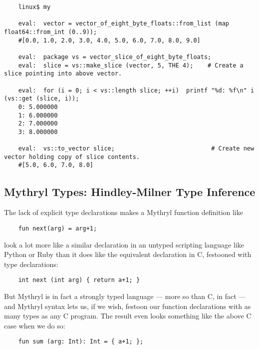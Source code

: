 \begin{verbatim}
    linux$ my

    eval:  vector = vector_of_eight_byte_floats::from_list (map float64::from_int (0..9));
    #[0.0, 1.0, 2.0, 3.0, 4.0, 5.0, 6.0, 7.0, 8.0, 9.0]

    eval:  package vs = vector_slice_of_eight_byte_floats;
    eval:  slice = vs::make_slice (vector, 5, THE 4);    # Create a slice pointing into above vector.

    eval:  for (i = 0; i < vs::length slice; ++i)  printf "%d: %f\n" i (vs::get (slice, i));
    0: 5.000000
    1: 6.000000
    2: 7.000000
    3: 8.000000

    eval:  vs::to_vector slice;                           # Create new vector holding copy of slice contents.
    #[5.0, 6.0, 7.0, 8.0]
\end{verbatim}

\cutend*



\subsection{Mythryl Types:  Hindley-Milner Type Inference}

The lack of explicit type declarations makes a Mythryl function definition like 

\begin{verbatim}
    fun next(arg) = arg+1;
\end{verbatim}

look a lot more like a similar declaration in an untyped scripting 
language like Python or Ruby than it does like the equivalent declaration 
in C, festooned with type declarations:

\begin{verbatim}
    int next (int arg) { return a+1; } 
\end{verbatim}

But Mythryl is in fact a strongly typed language --- more so than C, 
in fact --- and Mythryl syntax lets us, if we wish, festoon our function 
declarations with as many types as any C program.  The result even 
looks something like the above C case when we do so:

\begin{verbatim}
    fun sum (arg: Int): Int = { a+1; };
\end{verbatim}



